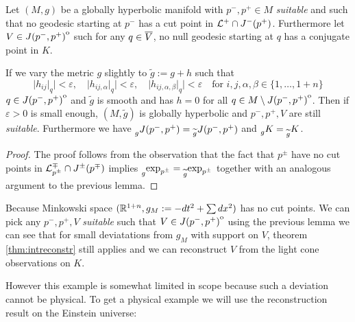 \begin{corollary}
    Let $(M,g)$ be a globally hyperbolic manifold with $p^-,p^+\in M$ \emph{suitable} and such that no geodesic starting at $p^-$ has a cut point in ${\mathcal{L}}^+\cap J^-(p^+)$. Furthermore let $V\in {\kern0ptJ(p^-,p^+)}^{\mathrm{o}}$ such for any $q\in {\overline{V}}$, no null geodesic starting at $q$ has a conjugate point in $K$.
    
    If we vary the metric $g$ slightly to $\widetilde{g}:=g+h$ such that 
    \[
        \lvert h_{ij}\rvert_q \rvert <\varepsilon, \quad \lvert h_{ij,\alpha}\rvert_q \rvert <\varepsilon, \quad \lvert h_{ij,\alpha,\beta}\rvert_q \rvert <\varepsilon \quad \text{for } i,j,\alpha,\beta\in \{1,\dots, 1+n\}
    \] $q\in {\kern0ptJ(p^-,p^+)}^{\mathrm{o}}$
    and $\widetilde{g}$ is smooth and has $h=0$ for all $q\in M\setminus {\kern0ptJ(p^-,p^+)}^{\mathrm{o}}$. Then if $\varepsilon>0$ is small enough, $(M,\widetilde{g})$ is globally hyperbolic and $p^-,p^+,V$ are still \emph{suitable}. Furthermore we have $\prescript{}{g}{J(p^-,p^+)}=\prescript{}{\widetilde{g}}{J(p^-,p^+)}$ and $\prescript{}{g}{K}=\prescript{}{\widetilde{g}}{K}$.
\end{corollary}
\begin{proof}
    The proof follows from the observation that the fact that $p^\pm$ have no cut points in ${\mathcal{L}}^\mp_{p^\pm} \cap J^\pm(p^\mp)$ implies $\prescript{}{g}{\exp_{p^\pm}}= \prescript{}{\widetilde{g}}{\exp_{p^\pm}}$ together with an analogous argument to the previous lemma.
\end{proof}

\begin{example}
    Because Minkowski space $(\mathbb{R}^{1+n}, g_M:=-dt^2 + \sum dx^2)$ has no cut points. We can pick any $p^-,p^+,V$ \emph{suitable} such that $V\in {\kern0ptJ(p^-,p^+)}^{\mathrm{o}}$ using the previous lemma we can see that for small deviatations from $g_M$ with support on $V$, theorem \ref{thm:intreconstr} still applies and we can reconstruct $V$ from the light cone observations on $K$.
\end{example}



However this example is somewhat limited in scope because such a deviation cannot be physical. To get a physical example we will use the reconstruction result on the Einstein universe:


